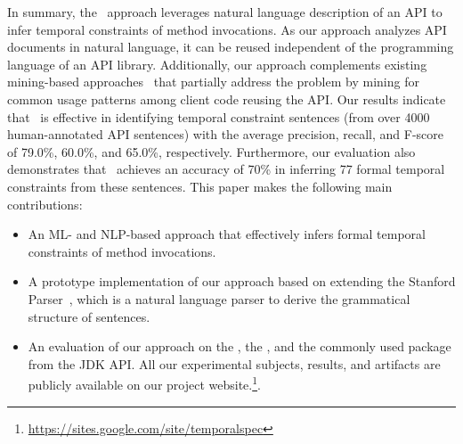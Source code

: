 In summary, the \tool\ approach leverages natural language description of an API to infer temporal constraints of method invocations.
As our approach analyzes API documents in natural language, it can be reused independent of the programming language of an API library.
Additionally, our approach complements existing mining-based approaches~\cite{buse2012synthesizing, thummalapenta07parseweb, Wang:2013:MSR, Zhong:2009:MMR} that partially address the problem by mining for common usage patterns among client code reusing the API.
Our results indicate that \tool\ is effective in identifying temporal
constraint sentences (from over
4000 human-annotated API sentences) with the average precision, recall, and F-score
of 79.0\%, 60.0\%, and 65.0\%, respectively.
Furthermore, our evaluation also demonstrates that \tool\ achieves an accuracy of 70\% in inferring 77 formal temporal constraints from these sentences.
This paper makes the following main contributions:


\begin{itemize}
	\item An ML- and NLP-based approach that effectively infers formal temporal constraints of method invocations. 
	\item A prototype implementation of our approach based on extending the Stanford Parser~\cite{Klein03}, which is a natural language parser to derive the grammatical structure of sentences.
	\item An evaluation of our approach on the \amazonAPI, the \paypalAPI, and the commonly used package  from the JDK API.
	All our experimental subjects, results, and artifacts are publicly available on our project website.\footnote{\url{https://sites.google.com/site/temporalspec}}.
\end{itemize}




